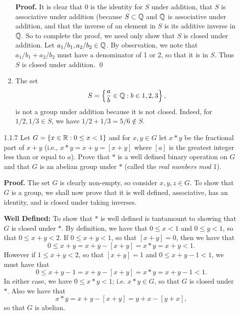 \begin{enumerate}
\begin{enumerate}
               \textbf{Proof.} It is clear that 0 is the identity for $S$ under
               addition, that $S$ is associative under addition (because
               $S \subset \mathbb{Q}$ and $\mathbb{Q}$ is associative under addition, and that
               the inverse of an element in $S$ is its additive inverse in $\mathbb{Q}$.
               So to complete the proof, we need only show that $S$ is closed
               under addition. Let $a_1/b_1, a_2/b_2 \in \mathbb{Q}$. By observation, we
               note that $a_1/b_1 + a_2/b_2$ must have a denominator of 1 or 2,
               so that it is in $S$. Thus $S$ is closed under addition. \qed
         \item The set
               $$S = \left\{\frac{a}{b} \in \mathbb{Q} : b \in {1, 2, 3} \right\},$$
               is not a group under addition because it is not closed. Indeed,
               for $1/2, 1/3 \in S$, we have $1/2 + 1/3 = 5/6 \notin S$.
      \end{enumerate}
   \item[1.1.7]   Let $G = \{x \in \mathbb{R} : 0 \le x < 1\}$ and for $x, y \in G$ let
                  $x * y$ be the fractional part of $x + y$ (i.e.,
                  $x * y = x + y = [x + y]$ where $[a]$ is the greatest integer
                  less than or equal to $a$). Prove that $*$ is a well defined
                  binary operation on $G$ and that $G$ is an abelian group under
                  $*$ (called the \textit{real numbers mod }1).
                  
      \textbf{Proof.} The set $G$ is clearly non-empty, so consider
      $x, y, z \in G$. To show that $G$ is a group, we shall now prove that it 
      is well defined, associative, has an identity, and is closed under taking
      inverses.

      \textbf{Well Defined:} To show that $*$ is well defined is tantamount to
      showing that $G$ is closed under $*$.  By definition, we have that
      $0 \le x < 1$ and $0 \le y < 1$, so that $0 \le x + y < 2$. If
      $0 \le x + y < 1$, so that $[x + y] = 0$, then we have that
      $$0 \le x + y = x + y - [x + y] = x * y = x + y < 1.$$
      However if $1 \le x + y < 2$, so that $[x + y] = 1$ and
      $0 \le x + y - 1 < 1$, we must have that
      $$0 \le x + y - 1 = x + y - [x + y] = x * y = x + y - 1 < 1.$$
      In either case, we have $0 \le x * y < 1$; i.e. $x * y \in G$, so that $G$ 
      is closed under $*$. Also we have that
      $$x * y = x + y - [x + y] = y + x - [y + x],$$
      so that $G$ is abelian.


\end{enumerate}
